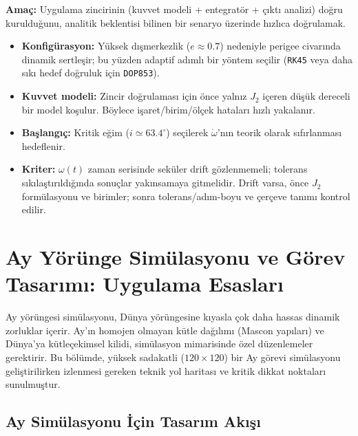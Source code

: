 \begin{tcolorbox}[
  colback=blue!5!white,
  colframe=blue!75!black,
  title=\textbf{Örnek Tasarım Senaryosu: Molniya Yörüngesi ile Zincir Doğrulama}
]
\textbf{Amaç:} Uygulama zincirinin (kuvvet modeli + entegratör + çıktı analizi) doğru kurulduğunu,
analitik beklentisi bilinen bir senaryo üzerinde hızlıca doğrulamak.

\begin{itemize}
    \item \textbf{Konfigürasyon:} Yüksek dışmerkezlik ($e\approx0.7$) nedeniyle perigee civarında dinamik sertleşir; bu yüzden
    adaptif adımlı bir yöntem seçilir (\texttt{RK45} veya daha sıkı hedef doğruluk için \texttt{DOP853}).
    \item \textbf{Kuvvet modeli:} Zincir doğrulaması için önce yalnız $J_2$ içeren düşük dereceli bir model koşulur.
    Böylece işaret/birim/ölçek hataları hızlı yakalanır.
    \item \textbf{Başlangıç:} Kritik eğim ($i\simeq63.4^\circ$) seçilerek $\dot{\omega}$'nın teorik olarak sıfırlanması hedeflenir.
    \item \textbf{Kriter:} $\omega(t)$ zaman serisinde seküler drift gözlenmemeli; tolerans sıkılaştırıldığında sonuçlar yakınsamaya
    gitmelidir. Drift varsa, önce $J_2$ formülasyonu ve birimler; sonra tolerans/adım-boyu ve çerçeve tanımı kontrol edilir.
\end{itemize}
\end{tcolorbox}




\newpage
\section{Ay Yörünge Simülasyonu ve Görev Tasarımı: Uygulama Esasları}

Ay yörüngesi simülasyonu, Dünya yörüngesine kıyasla çok daha hassas dinamik zorluklar içerir. Ay'ın homojen olmayan kütle dağılımı (Mascon yapıları) ve Dünya'ya kütleçekimsel kilidi, simülasyon mimarisinde özel düzenlemeler gerektirir. Bu bölümde, yüksek sadakatli ($120 \times 120$) bir Ay görevi simülasyonu geliştirilirken izlenmesi gereken teknik yol haritası ve kritik dikkat noktaları sunulmuştur.

\subsection{Ay Simülasyonu İçin Tasarım Akışı}

